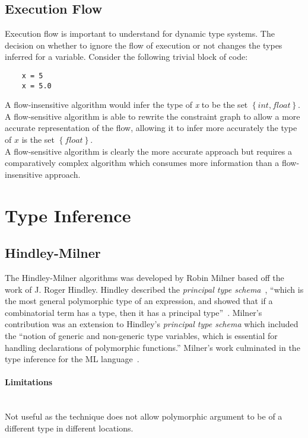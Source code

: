 \documentclass[12pt, titlepage]{article}
\begin{document}
\subsection{Execution Flow}
Execution flow is important to understand for dynamic type systems. The decision on whether to ignore the flow of execution or not changes the types inferred for a variable. Consider the following trivial block of code:
\begin{lstlisting}
	x = 5
	x = 5.0
\end{lstlisting}
A flow-insensitive algorithm would infer the type of \textit{x} to be the set $\left\{ {int, float}\right\}$. A flow-sensitive algorithm is able to rewrite the constraint graph to allow a more accurate representation of the flow, allowing it to infer more accurately the type of $x$ is the set $\left\{ {float}\right\}$. \\
A flow-sensitive algorithm is clearly the more accurate approach but requires a comparatively complex algorithm which consumes more information than a flow-insensitive approach.


\section{Type Inference}
\subsection{Hindley-Milner}
The Hindley-Milner algorithms was developed by Robin Milner based off the work of J. Roger Hindley. Hindley described the \textit{principal
type schema}~\cite{hindley69}, ``which is the most general polymorphic type of an expression, and showed that if a combinatorial term has a type, then it has a principal type''~\cite{cardelli87}. Milner's contribution was an extension to Hindley's \textit{principal type schema} which included the ``notion of generic and non-generic type variables, which is essential for handling declarations of polymorphic functions.'' Milner's work culminated in the type inference for the ML language~\cite{milner84}. \\


\paragraph{Limitations}\mbox{}\\
Not useful as the technique does not allow polymorphic argument to be of a different type in different locations.
\end{document}
